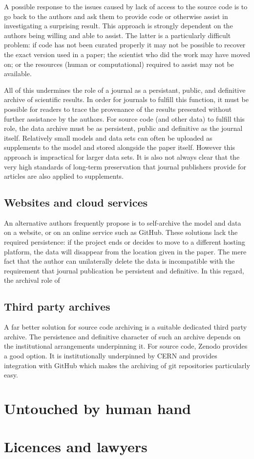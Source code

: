 \documentclass[a4paper,11pt]{article}
\begin{document}
A possible response to the issues caused by lack of access to the source
code is to go back to the authors and ask them to provide code or otherwise
assist in investigating a surprising result. This approach is strongly
dependent on the authors being willing and able to assist. The latter is a
particularly difficult problem: if code has not been curated properly it may
not be possible to recover the exact version used in a paper; the scientist
who did the work may have moved on; or the resources (human or
computational) required to assist may not be available.

All of this undermines the role of a journal as a persistant, public, and
definitive archive of scientific results. In order for journals to fulfill
this function, it must be possible for readers to trace the provenance of
the results presented without further assistance by the authors. For source
code (and other data) to fulfill this role, the data archive must be as
persistent, public and definitive as the journal itself. Relatively small
models and data sets can often be uploaded as supplements to the model and
stored alongside the paper itself. However this approach is impractical for
larger data sets. It is also not always clear that the very high standards
of long-term preservation that journal publishers provide for articles are
also applied to supplements. 

\subsection{Websites and cloud services}

An alternative authors frequently propose is to self-archive the model and data
on a website, or on an online service such as GitHub. These solutions lack
the required persistence: if the project ends or decides to move to a
different hosting platform, the data will disappear from the location given
in the paper. The mere fact that the author can unilaterally delete the data
is incompatible with the requirement that journal publication be persistent
and definitive. In this regard, the archival role of 

\subsection{Third party archives}

A far better solution for source code archiving is a suitable dedicated
third party archive. The persistence and definitive character of such an
archive depends on the institutional arrangements underpinning it. For
source code, Zenodo provides a good option. It is institutionally
underpinned by CERN and provides integration with GitHub which makes the
archiving of git repositories particularly easy. 

\section{Untouched by human hand}

\section{Licences and lawyers}
\end{document}
